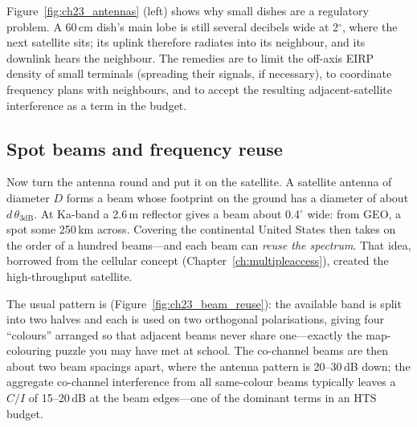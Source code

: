 
Figure~\ref{fig:ch23_antennas} (left) shows why small dishes are a regulatory problem. A 60\,cm
dish's main lobe is still several decibels wide at 2$^\circ$, where the next satellite sits;
its uplink therefore radiates into its neighbour, and its downlink hears the neighbour. The
remedies are to limit the off-axis EIRP density of small terminals (spreading their signals, if
necessary), to coordinate frequency plans with neighbours, and to accept the resulting
adjacent-satellite interference as a term in the budget.

\subsection{Spot beams and frequency reuse}

Now turn the antenna round and put it on the satellite. A satellite antenna of diameter $D$ forms
a beam whose footprint on the ground has a diameter of about $d\,\theta_{3\text{dB}}$. At Ka-band a
2.6\,m reflector gives a beam about 0.4$^\circ$ wide: from GEO, a spot some 250\,km across. Covering
the continental United States then takes on the order of a hundred beams---and each beam can
\emph{reuse the spectrum}. That idea, borrowed from the cellular concept
(Chapter~\ref{ch:multipleaccess}), created the high-throughput satellite.

The usual pattern is  (Figure~\ref{fig:ch23_beam_reuse}): the available
band is split into two halves and each is used on two orthogonal polarisations, giving four
``colours'' arranged so that adjacent beams never share one---exactly the map-colouring puzzle you
may have met at school. The co-channel beams are then about two beam spacings apart, where the
antenna pattern is 20--30\,dB down; the aggregate co-channel interference from all same-colour
beams typically leaves a $C/I$ of 15--20\,dB at the beam edges---one of the dominant terms in an
HTS budget.


